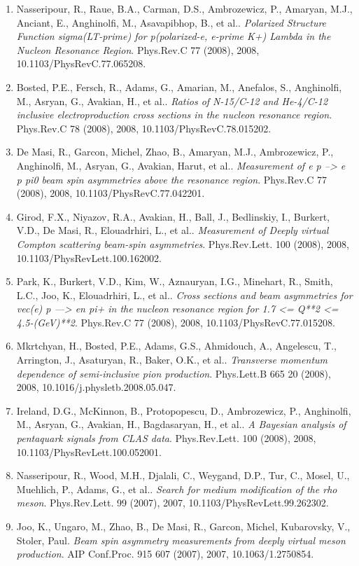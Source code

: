 \begin{enumerate}
\item Nasseripour, R., Raue, B.A., Carman, D.S., Ambrozewicz, P., Amaryan, M.J., Anciant, E., Anghinolfi, M., Asavapibhop, B., et al.. \textit{Polarized Structure Function sigma(LT-prime) for p(polarized-e, e-prime K+) Lambda in the Nucleon Resonance Region}. Phys.Rev.C 77 (2008), 2008, 10.1103/PhysRevC.77.065208.
\item Bosted, P.E., Fersch, R., Adams, G., Amarian, M., Anefalos, S., Anghinolfi, M., Asryan, G., Avakian, H., et al.. \textit{Ratios of N-15/C-12 and He-4/C-12 inclusive electroproduction cross sections in the nucleon resonance region}. Phys.Rev.C 78 (2008), 2008, 10.1103/PhysRevC.78.015202.
\item De Masi, R., Garcon, Michel, Zhao, B., Amaryan, M.J., Ambrozewicz, P., Anghinolfi, M., Asryan, G., Avakian, Harut, et al.. \textit{Measurement of e p --> e p pi0 beam spin asymmetries above the resonance region}. Phys.Rev.C 77 (2008), 2008, 10.1103/PhysRevC.77.042201.
\item Girod, F.X., Niyazov, R.A., Avakian, H., Ball, J., Bedlinskiy, I., Burkert, V.D., De Masi, R., Elouadrhiri, L., et al.. \textit{Measurement of Deeply virtual Compton scattering beam-spin asymmetries}. Phys.Rev.Lett. 100 (2008), 2008, 10.1103/PhysRevLett.100.162002.
\item Park, K., Burkert, V.D., Kim, W., Aznauryan, I.G., Minehart, R., Smith, L.C., Joo, K., Elouadrhiri, L., et al.. \textit{Cross sections and beam asymmetries for vec(e) p ---> en pi+ in the nucleon resonance region for 1.7 <= Q**2 <= 4.5-(GeV)**2}. Phys.Rev.C 77 (2008), 2008, 10.1103/PhysRevC.77.015208.
\item Mkrtchyan, H., Bosted, P.E., Adams, G.S., Ahmidouch, A., Angelescu, T., Arrington, J., Asaturyan, R., Baker, O.K., et al.. \textit{Transverse momentum dependence of semi-inclusive pion production}. Phys.Lett.B 665 20 (2008), 2008, 10.1016/j.physletb.2008.05.047.
\item Ireland, D.G., McKinnon, B., Protopopescu, D., Ambrozewicz, P., Anghinolfi, M., Asryan, G., Avakian, H., Bagdasaryan, H., et al.. \textit{A Bayesian analysis of pentaquark signals from CLAS data}. Phys.Rev.Lett. 100 (2008), 2008, 10.1103/PhysRevLett.100.052001.
\item Nasseripour, R., Wood, M.H., Djalali, C., Weygand, D.P., Tur, C., Mosel, U., Muehlich, P., Adams, G., et al.. \textit{Search for medium modification of the rho meson}. Phys.Rev.Lett. 99 (2007), 2007, 10.1103/PhysRevLett.99.262302.
\item Joo, K., Ungaro, M., Zhao, B., De Masi, R., Garcon, Michel, Kubarovsky, V., Stoler, Paul. \textit{Beam spin asymmetry measurements from deeply virtual meson production}. AIP Conf.Proc. 915 607 (2007), 2007, 10.1063/1.2750854.

\end{enumerate}
